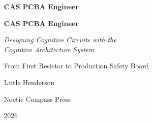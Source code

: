 
\frontmatter
\pagestyle{plainbook}

\thispagestyle{empty}
\begin{center}
  \vspace*{2.5in}
  {\huge\bfseries CAS PCBA Engineer\par}
\end{center}
\cleardoublepage

\thispagestyle{empty}
\begin{center}
  \vspace*{1.1in}
  {\Huge\bfseries CAS PCBA Engineer\par}
  \vspace{0.55in}
  {\Large\itshape Designing Cognitive Circuits with the\\[0.10in] Cognitive Architecture System\par}
  \vspace{0.35in}
  {\large From First Resistor to Production Safety Board\par}
  \vspace{1.35in}
  {\Large Little Henderson\par}
  \vfill
  {\normalsize Noetic Compass Press\par}
  {\small 2026\par}
\end{center}
\clearpage

